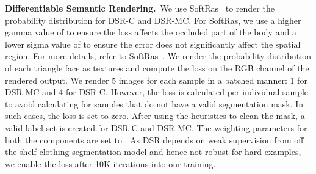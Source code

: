 \documentclass[10pt,twocolumn,letterpaper]{article}
\newcommand{\modelname}[0]{DSR\xspace}
\begin{document}
\textbf{Differentiable Semantic Rendering.}~We use SoftRas~\cite{softras} to render the probability distribution for \modelname-C and \modelname-MC. For SoftRas, we use a higher gamma value of  to ensure the loss affects the occluded part of the body and a lower sigma value of  to ensure the error does not significantly affect the spatial region. For more details, refer to SoftRas~\cite{softras}. We render the probability distribution of each triangle face as textures and compute the loss on the RGB channel of the rendered output. 
We render 5 images for each sample in a batched manner: 1 for \modelname-MC and 4 for \modelname-C. However, the loss is calculated per individual sample to avoid calculating for samples that do not have a valid segmentation mask. In such cases, the loss is set to zero. After using the heuristics to clean the mask, a valid label set is created for \modelname-C and \modelname-MC. The weighting parameters for both the components are set to . As {\modelname} depends on weak supervision from off the shelf clothing segmentation model and hence not robust for hard examples, we enable the loss after 10K iterations into our training. \begin{table}[t]
\centering
{}
   \vspace{-0.05in}
\caption{\textbf{Baseline Comparisons for DSR on 3DPW.} C-EFT is the regressor trained with COCO-EFT and standard losses. DSR-FB is supervised with a full-body silhouette. DSR-MC is minimal-clothing, DSR-C is clothing and DSR-MVP is manual labelling of clothing and minimal-clothing.}
\label{tab:baseline}
\end{table}
\end{document}
